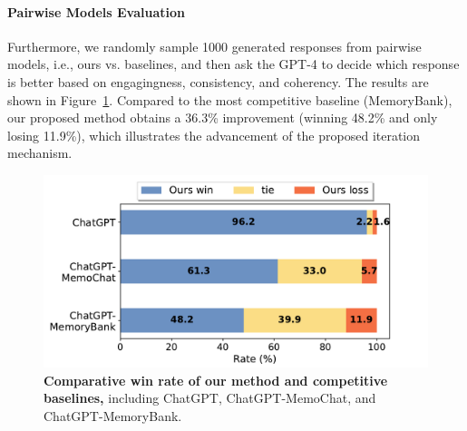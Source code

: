 \documentclass[authoryear,preprint,review,12pt]{elsarticle}
\begin{document}
\paragraph*{Pairwise Models Evaluation}
Furthermore, we randomly sample 1000 generated responses from pairwise models, i.e., ours vs. baselines, and then ask the GPT-4 to decide which response is better based on engagingness,  consistency, and coherency. The results are shown in Figure~\ref{fig:win}. Compared to the most competitive baseline (MemoryBank), our proposed method obtains a 36.3\% improvement (winning 48.2\% and only losing 11.9\%), which illustrates the advancement of the proposed iteration mechanism.
\begin{figure}[t]
  \centering
\includegraphics[scale=0.5]{win_rate_5.pdf}
  \caption{\textbf{Comparative win rate of our method and competitive baselines,} including ChatGPT, ChatGPT-MemoChat, and ChatGPT-MemoryBank.}
  \label{fig:win}
\end{figure}
\label{sec:analysis}
\end{document}
